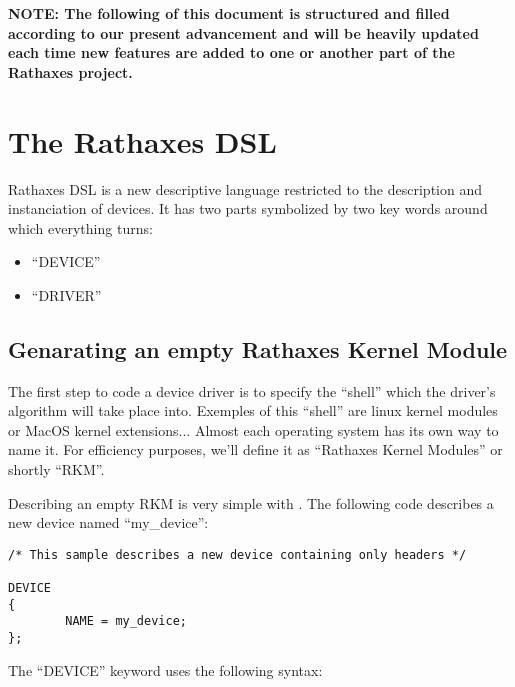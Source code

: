 \documentclass[a4paper,11pt]{report}
\begin{document}
  \textbf{NOTE: The following of this document is structured and filled
   according to our present advancement and will be heavily updated each time
   new features are added to one or another part of the Rathaxes project.}




   \chapter{The Rathaxes DSL}
   
   Rathaxes DSL is a new descriptive language restricted to the description and
   instanciation of devices. It has two parts symbolized by two key words around
   which everything turns:

  \begin{itemize}
    \item ``DEVICE''
    \item ``DRIVER''
  \end{itemize}

  \section{Genarating an empty Rathaxes Kernel Module}

  The first step to code a device driver is to specify the ``shell'' which the
  driver's algorithm will take place into. Exemples of this ``shell'' are linux
  kernel modules or MacOS kernel extensions... Almost each operating system has
  its own way to name it. For efficiency purposes, we'll define it as 
  ``Rathaxes Kernel Modules'' or shortly ``RKM''.

  Describing an empty RKM is very simple with \rtx. The following code describes
  a new device named ``my\_device'':




\lstset{language=rathaxes}
\begin{lstlisting}
/* This sample describes a new device containing only headers */

DEVICE
{
        NAME = my_device;
};
\end{lstlisting}




  The ``DEVICE'' keyword uses the following syntax:


\end{document}
